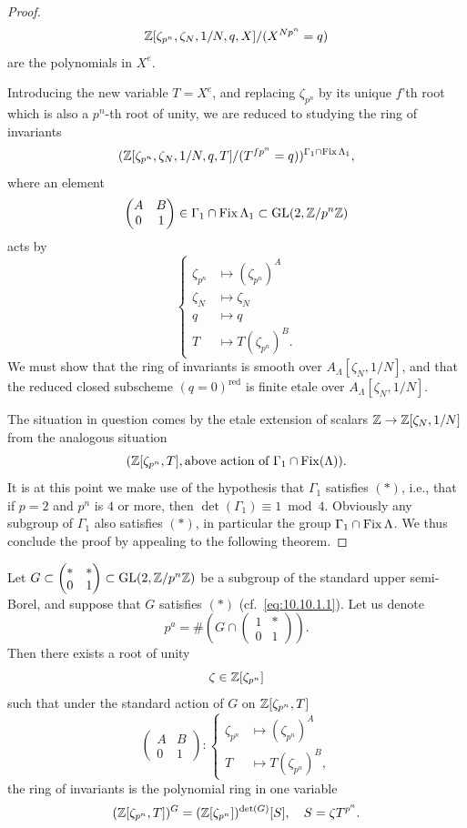 \begin{proof}
\[
\mathbb{Z}[\zeta_{p^n}, \zeta_N, 1/N, q, X]/(X^{Np^n} = q)
\]
are the polynomials in $X^e$.
\par
Introducing the new variable $T = X^e$, and replacing $\zeta_{p^n}$ by its unique $f$'th root which is also a $p^n$-th root of unity, we are reduced to studying the ring of invariants
\[
(\mathbb{Z}[\zeta_{p^n}, \zeta_N, 1/N, q, T]/(T^{fp^n} = q))^{\Gamma_1 \cap \operatorname{Fix}\Lambda_1} ,
\]
where an element
\[
\begin{pmatrix} A & B \\ 0 & 1 \end{pmatrix} \in \Gamma_1 \cap \operatorname{Fix}\Lambda_1 \subset \operatorname{GL}(2, \mathbb{Z}/p^n\mathbb{Z})
\]
acts by
\[
\left\{
\begin{aligned}
\zeta_{p^n} &\mapsto (\zeta_{p^n})^A \\
\zeta_N &\mapsto \zeta_N \\
q &\mapsto q \\
T &\mapsto T(\zeta_{p^n})^B .
\end{aligned}
\right.
\]
We must show that the ring of invariants is smooth over $A_\Lambda[\zeta_N, 1/N]$, and that the reduced closed subscheme $(q=0)^{\mathrm{red}}$ is finite etale over $A_\Lambda[\zeta_N, 1/N]$.
\par
The situation in question comes by the etale extension of scalars $\mathbb{Z} \to \mathbb{Z}[\zeta_N, 1/N]$ from the analogous situation
\[
(\mathbb{Z}[\zeta_{p^n}, T], \text{above action of } \Gamma_1 \cap \operatorname{Fix}(\Lambda)) .
\]
It is at this point we make use of the hypothesis that $\Gamma_1$ satisfies $(*)$, i.e., that if $p = 2$ and $p^n$ is $4$ or more, then $\det(\Gamma_1) \equiv 1 \bmod 4$. Obviously any subgroup of $\Gamma_1$ also satisfies $(*)$, in particular the group $\Gamma_1 \cap \operatorname{Fix}\Lambda$. We thus conclude the proof by appealing to the following theorem.
\end{proof}

\begin{kthm}\label{thm:10.10.4}
Let $G \subset \begin{pmatrix} * & * \\ 0 & 1 \end{pmatrix} \subset \operatorname{GL}(2, \mathbb{Z}/p^n\mathbb{Z})$ be a subgroup of the standard upper semi-Borel, and suppose that $G$ satisfies $(*)$ (cf.~\ref{eq:10.10.1.1}). Let us denote
\[
p^a = \#\left(G \cap \begin{pmatrix} 1 & * \\ 0 & 1 \end{pmatrix}\right) .
\]
Then there exists a root of unity
\[
\zeta \in \mathbb{Z}[\zeta_{p^n}]
\]
such that under the standard action of $G$ on $\mathbb{Z}[\zeta_{p^n}, T]$
\[
\begin{pmatrix} A & B \\ 0 & 1 \end{pmatrix} :
\left\{
\begin{aligned}
\zeta_{p^n} &\mapsto (\zeta_{p^n})^A \\
T &\mapsto T(\zeta_{p^n})^B ,
\end{aligned}
\right.
\]
the ring of invariants is the polynomial ring in one variable
\[
(\mathbb{Z}[\zeta_{p^n}, T])^G = (\mathbb{Z}[\zeta_{p^n}])^{\det(G)}[S], \quad S = \zeta T^{p^a} .
\]
\end{kthm}

